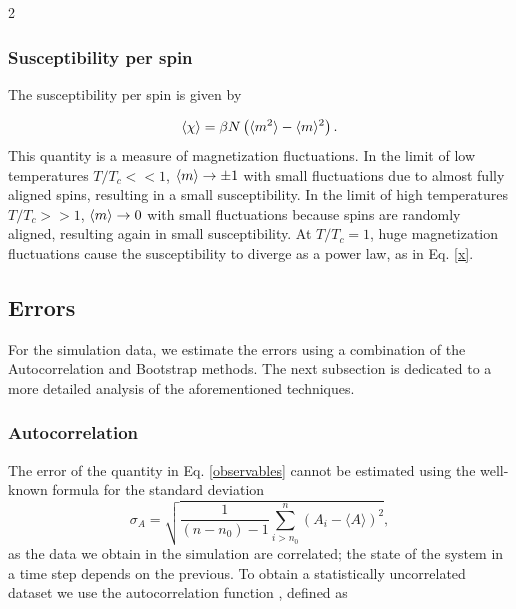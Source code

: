 \documentclass{article}
\begin{document}
\begin{multicols}{2}
\subsubsection{Susceptibility per spin}

The susceptibility per spin is given by

\begin{align}
    \braket{\chi} = \beta N \left(
\langle m^2 \rangle - \langle m \rangle^2 \right).
\end{align}
%
This quantity is a measure of magnetization fluctuations. In the limit of low temperatures $T/T_c<<1$, $\braket{m} \to \pm1$ with small fluctuations due to almost fully aligned spins, resulting in a small susceptibility. In the limit of high temperatures $T/T_c>>1$, $\braket{m} \to 0$ with small fluctuations because spins are randomly aligned, resulting again in small susceptibility. At $T/T_c=1$, huge magnetization fluctuations cause the susceptibility to diverge as a power law, as in Eq. \eqref{x}.

\subsection{Errors}

For the simulation data, we estimate the errors using a combination of the Autocorrelation and Bootstrap methods. The next subsection is dedicated to a more detailed analysis of the aforementioned techniques.

\subsubsection{Autocorrelation}
The error of the quantity in Eq. \eqref{observables} cannot be estimated using the well-known formula for the standard deviation
\begin{equation}
 \sigma_A = \sqrt{\frac{1}{(n-n_0)-1}\sum^n_{i>n_0}\left(A_i - \langle A \rangle \right)^2},
\end{equation}
as the data we obtain in the simulation are correlated; the state of the system in a time step depends on the previous. To obtain a statistically uncorrelated dataset we use the autocorrelation function \cite{computational_book}, defined as


\end{multicols}
\end{document}
